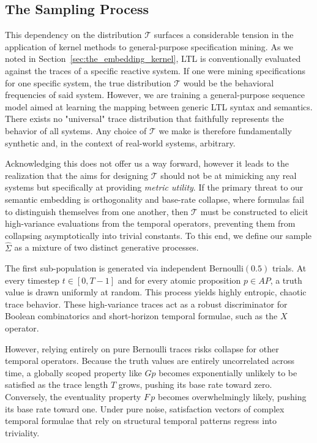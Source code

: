 \documentclass[titlepage,a4paper,11pt]{report}
\begin{document}
    \subsection{The Sampling Process}
    This dependency on the distribution $\mathcal{T}$ surfaces a considerable tension in the application of kernel methods to general-purpose specification mining. As we noted in Section~\ref{sec:the_embedding_kernel}, LTL is conventionally evaluated against the traces of a specific reactive system. If one were mining specifications for one specific system, the true distribution $\mathcal{T}$ would be the behavioral frequencies of said system. However, we are training a general-purpose sequence model aimed at learning the mapping between generic LTL syntax and semantics. There exists no "universal" trace distribution that faithfully represents the behavior of all systems. Any choice of $\mathcal{T}$ we make is therefore fundamentally synthetic and, in the context of real-world systems, arbitrary.

    Acknowledging this does not offer us a way forward, however it leads to the realization that the aims for designing $\mathcal{T}$ should not be at mimicking any real systems but specifically at providing \emph{metric utility}. If the primary threat to our semantic embedding is orthogonality and base-rate collapse, where formulas fail to distinguish themselves from one another, then $\mathcal{T}$ must be constructed to elicit high-variance evaluations from the temporal operators, preventing them from collapsing asymptotically into trivial constants. To this end, we define our sample $\widehat\Sigma$ as a mixture of two distinct generative processes. 
    
    The first sub-population is generated via independent Bernoulli$(0.5)$ trials. At every timestep $t \in [0, T-1]$ and for every atomic proposition $p \in AP$, a truth value is drawn uniformly at random. This process yields highly entropic, chaotic trace behavior. These high-variance traces act as a robust discriminator for Boolean combinatorics and short-horizon temporal formulae, such as the $X$ operator.

    However, relying entirely on pure Bernoulli traces risks collapse for other temporal operators. Because the truth values are entirely uncorrelated across time, a globally scoped property like $G p$ becomes exponentially unlikely to be satisfied as the trace length $T$ grows, pushing its base rate toward zero. Conversely, the eventuality property $F\, p$ becomes overwhelmingly likely, pushing its base rate toward one. Under pure noise, satisfaction vectors of complex temporal formulae that rely on structural temporal patterns regress into triviality.
    
\end{document}
